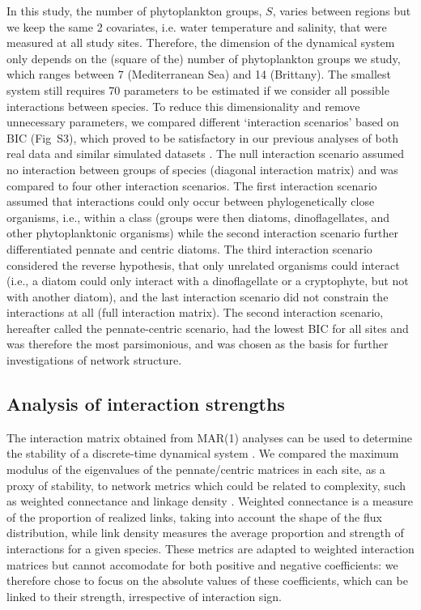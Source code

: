 \documentclass[10pt]{article}
\begin{document}
In this study, the number of phytoplankton groups, $S$, varies between
regions but we keep the same 2 covariates, i.e. water temperature
and salinity, that were measured at all study sites. Therefore, the
dimension of the dynamical system only depends on the (square of the)
number of phytoplankton groups we study, which ranges between 7 (Mediterranean
Sea) and 14 (Brittany). The smallest system still requires 70 parameters
to be estimated if we consider all possible interactions between species.
To reduce this dimensionality and remove unnecessary parameters, we
compared different `interaction scenarios' based on BIC (Fig~S3), which proved to be satisfactory in our previous analyses
of both real data and similar simulated datasets \citep{barraquand_coastal_2018}.
The null interaction scenario assumed no interaction between groups
of species (diagonal interaction matrix) and was compared to four
other interaction scenarios. The first interaction scenario assumed
that interactions could only occur between phylogenetically close
organisms, i.e., within a class (groups were then diatoms, dinoflagellates,
and other phytoplanktonic organisms) while the second interaction
scenario further differentiated pennate and centric diatoms. The third
interaction scenario considered the reverse hypothesis, that only
unrelated organisms could interact (i.e., a diatom could only interact
with a dinoflagellate or a cryptophyte, but not with another diatom),
and the last interaction scenario did not constrain the interactions
at all (full interaction matrix). The second interaction scenario,
hereafter called the pennate-centric scenario, had the lowest BIC
for all sites and was therefore the most parsimonious, and was chosen
as the basis for further investigations of network structure.

\subsection*{Analysis of interaction strengths}

The interaction matrix obtained from MAR(1) analyses can be used to
determine the stability of a discrete-time dynamical system \citep{ives_estimating_2003}.
We compared the maximum modulus of the eigenvalues of the pennate/centric
matrices in each site, as a proxy of stability, to network metrics
which could be related to complexity, such as weighted connectance
and linkage density \citep{breier_emergence_2018}. Weighted connectance
is a measure of the proportion of realized links, taking into account
the shape of the flux distribution, while link density measures the
average proportion and strength of interactions for a given species.
These metrics are adapted to weighted interaction matrices but cannot
accomodate for both positive and negative coefficients: we therefore
chose to focus on the absolute values of these coefficients, which
can be linked to their strength, irrespective of interaction sign.
\end{document}
